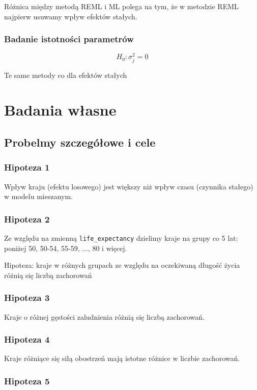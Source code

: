 \documentclass[12pt]{mwbk}
\theoremstyle{plain}
\theoremstyle{definition}
\theoremstyle{remark}
\begin{document}
Różnica między metodą REML i ML polega na tym, że w metodzie REML najpierw usuwamy wpływ efektów stałych.

\subsection{Badanie istotności parametrów}

$$H_0: \sigma^2_j=0$$

Te same metody co dla efektów stałych

\chapter{Badania własne}
\section{Probelmy szczegółowe i cele}
\subsection{Hipoteza 1}
Wpływ kraju (efektu losowego) jest większy niż wpływ czasu (czynnika stałego) w modelu mieszanym.
\subsection{Hipoteza 2}

Ze względu na zmienną \texttt{life\_expectancy} dzielimy kraje na grupy co 5 lat: poniżej 50, 50-54, 55-59, ..., 80 i więcej.

Hipoteza: kraje w różnych grupach ze względu na oczekiwaną długość życia różnią się liczbą zachorowań

\subsection{Hipoteza 3}

Kraje o różnej gęstości zaludnienia różnią się liczbą zachorowań.

\subsection{Hipoteza 4}

Kraje różniące się siłą obostrzeń mają istotne różnice w liczbie zachorowań.


\subsection{Hipoteza 5}
\end{document}
